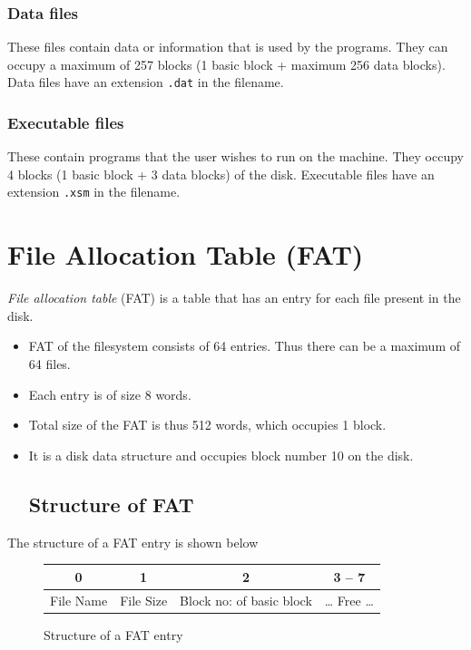 \documentclass[11pt]{article}
\begin{document}
\subsubsection{Data files} These files contain data or information that is used by the programs. They can occupy a maximum of 257 blocks (1 basic block + maximum 256 data blocks). Data files have an extension \texttt{.dat} in the filename.
	
\subsubsection{Executable files}  These contain programs that the user wishes to run on the machine. They occupy 4 blocks (1 basic block + 3 data blocks) of the disk. Executable files have an extension \texttt{.xsm} in the filename.


\section{File Allocation Table (FAT)}
\label{sec:fat}
\label{lbl:fat}
\emph{File allocation table} (FAT) is a table that has an entry for each file present in the disk.

\begin{itemize}
	\item FAT of the filesystem consists of 64 entries. Thus there can be a maximum of 64 files. 
	\item Each entry is of size 8 words.
	\item Total size of the FAT is thus 512 words, which occupies 1 block.
	\item It is a disk data structure and occupies block number 10 on the disk.

\subsection{Structure of FAT}
\end{itemize}

The structure of a FAT entry is shown below 

\begin{figure}[htp!] \small
	\centering
	\begin{tabular}{|c|c|c|c|}
		\hline
		0 & 1 & 2 & 3 -- 7 \\
		\hline
		File Name & File Size & Block no: of basic block & \dots{} Free \dots \\
		\hline
	\end{tabular}
	\caption{Structure of a FAT entry}
	\label{fig:fat_entry}
\end{figure}
\end{document}
